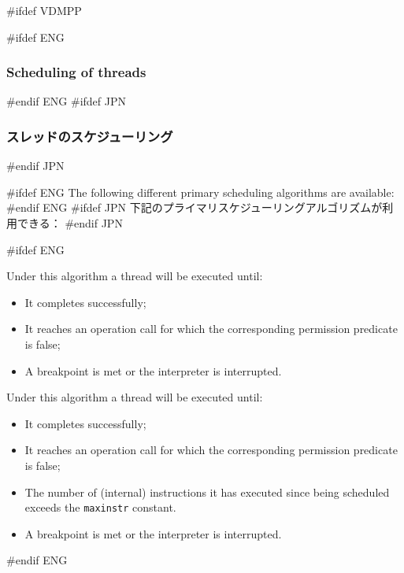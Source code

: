 \documentclass[\pformat,12pt]{article}
\begin{document}
#ifdef VDMPP

#ifdef ENG
\subsubsection{Scheduling of threads}\label{subsec:scheduling}
#endif ENG
#ifdef JPN
\subsubsection{スレッドのスケジューリング}\label{subsec:scheduling}
#endif JPN

#ifdef ENG
The following different primary scheduling algorithms are available:
#endif ENG
#ifdef JPN
下記のプライマリスケジューリングアルゴリズムが利用できる：
#endif JPN

\begin{description}

#ifdef ENG
\item[Pure Cooperative] Under this algorithm a thread will be executed
until:
\begin{itemize}
\item It completes successfully;
\item It reaches an operation call for which the corresponding
permission predicate is false;
\item A breakpoint is met or the interpreter is interrupted.
\end{itemize}
\item[Instruction number slicing] Under this algorithm a thread will
be executed until:
\begin{itemize}
\item It completes successfully;
\item It reaches an operation call for which the corresponding
permission predicate is false;
\item The number of (internal) instructions it has executed since
being scheduled exceeds the \texttt{maxinstr} constant.
\item A breakpoint is met or the interpreter is interrupted.
\end{itemize}
#endif ENG


\end{description}
\end{document}
